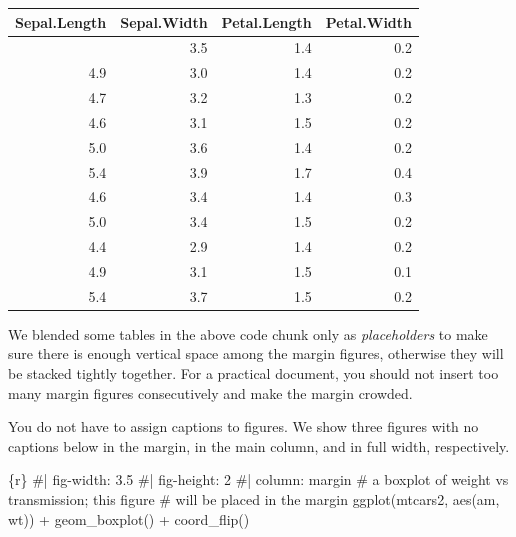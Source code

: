 \documentclass[
  letterpaper,
  DIV=11,
  numbers=noendperiod,
  oneside]{scrartcl}
\newenvironment{Shaded}{\begin{snugshade}}{\end{snugshade}}
\newcommand{\CommentTok}[1]{\textcolor[rgb]{0.37,0.37,0.37}{#1}}
\newcommand{\FunctionTok}[1]{\textcolor[rgb]{0.28,0.35,0.67}{#1}}
\newcommand{\InformationTok}[1]{\textcolor[rgb]{0.37,0.37,0.37}{#1}}
\newcommand{\NormalTok}[1]{\textcolor[rgb]{0.00,0.23,0.31}{#1}}
\newcommand{\SpecialCharTok}[1]{\textcolor[rgb]{0.37,0.37,0.37}{#1}}
\begin{document}
\begin{longtable}[]{@{}rrrr@{}}
\toprule\noalign{}
Sepal.Length & Sepal.Width & Petal.Length & Petal.Width \\
\midrule\noalign{}
\endhead
\bottomrule\noalign{}
\endlastfoot
5.1 & 3.5 & 1.4 & 0.2 \\
4.9 & 3.0 & 1.4 & 0.2 \\
4.7 & 3.2 & 1.3 & 0.2 \\
4.6 & 3.1 & 1.5 & 0.2 \\
5.0 & 3.6 & 1.4 & 0.2 \\
5.4 & 3.9 & 1.7 & 0.4 \\
4.6 & 3.4 & 1.4 & 0.3 \\
5.0 & 3.4 & 1.5 & 0.2 \\
4.4 & 2.9 & 1.4 & 0.2 \\
4.9 & 3.1 & 1.5 & 0.1 \\
5.4 & 3.7 & 1.5 & 0.2 \\
\end{longtable}

We blended some tables in the above code chunk only as
\emph{placeholders} to make sure there is enough vertical space among
the margin figures, otherwise they will be stacked tightly together. For
a practical document, you should not insert too many margin figures
consecutively and make the margin crowded.

You do not have to assign captions to figures. We show three figures
with no captions below in the margin, in the main column, and in full
width, respectively.

\begin{Shaded}
\begin{Highlighting}[]
\InformationTok{\textasciigrave{}\textasciigrave{}\textasciigrave{}\{r\}}
\CommentTok{\#| fig{-}width: 3.5}
\CommentTok{\#| fig{-}height: 2}
\CommentTok{\#| column: margin}
\CommentTok{\# a boxplot of weight vs transmission; this figure}
\CommentTok{\# will be placed in the margin}
\FunctionTok{ggplot}\NormalTok{(mtcars2, }\FunctionTok{aes}\NormalTok{(am, wt)) }\SpecialCharTok{+} \FunctionTok{geom\_boxplot}\NormalTok{() }\SpecialCharTok{+}
  \FunctionTok{coord\_flip}\NormalTok{()}
\InformationTok{\textasciigrave{}\textasciigrave{}\textasciigrave{}}
\end{Highlighting}
\end{Shaded}
\end{document}
